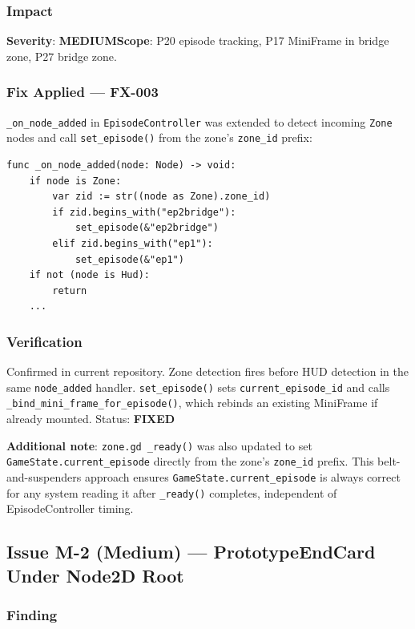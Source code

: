 \documentclass[12pt, a4paper]{article}
\newcommand{\sevMed}{\textcolor{medyell}{\textbf{MEDIUM}}}
\newcommand{\sevFixed}{\textcolor{passgre}{\textbf{FIXED}}}
\begin{document}
\subsubsection*{Impact}

\textbf{Severity}: \sevMed\quad\textbf{Scope}: P20 episode tracking, P17 MiniFrame in bridge zone, P27 bridge zone.

\subsubsection*{Fix Applied — FX-003}

\texttt{\_on\_node\_added} in \texttt{EpisodeController} was extended to
detect incoming \texttt{Zone} nodes and call \texttt{set\_episode()} from
the zone's \texttt{zone\_id} prefix:

\begin{lstlisting}
func _on_node_added(node: Node) -> void:
    if node is Zone:
        var zid := str((node as Zone).zone_id)
        if zid.begins_with("ep2bridge"):
            set_episode(&"ep2bridge")
        elif zid.begins_with("ep1"):
            set_episode(&"ep1")
    if not (node is Hud):
        return
    ...
\end{lstlisting}

\subsubsection*{Verification}

Confirmed in current repository. Zone detection fires before HUD detection in
the same \texttt{node\_added} handler. \texttt{set\_episode()} sets
\texttt{current\_episode\_id} and calls \texttt{\_bind\_mini\_frame\_for\_episode()},
which rebinds an existing MiniFrame if already mounted.
Status: \sevFixed

\textbf{Additional note}: \texttt{zone.gd}~\texttt{\_ready()} was also updated
to set \texttt{GameState.current\_episode} directly from the zone's
\texttt{zone\_id} prefix. This belt-and-suspenders approach ensures
\texttt{GameState.current\_episode} is always correct for any system reading it
after \texttt{\_ready()} completes, independent of EpisodeController timing.

\subsection{Issue M-2 (Medium) — PrototypeEndCard Under Node2D Root}

\subsubsection*{Finding}
\end{document}
